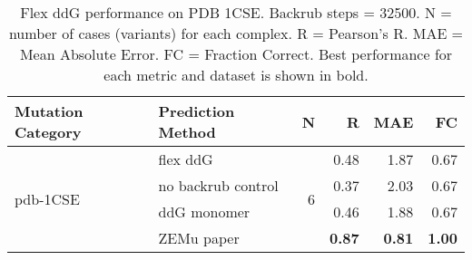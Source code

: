 \begin{table}
  \begin{tabular}{llrrrr}
\toprule
Mutation Category &   Prediction Method &  N &    R &  MAE &   FC \\
\midrule
 \multirow{ 4}{*}{pdb-1CSE} & flex ddG & \multirow{ 4}{*}{6} & 0.48 & 1.87 & 0.67  \\
 & no backrub control & & 0.37 & 2.03 & 0.67  \\
 & ddG monomer & & 0.46 & 1.88 & 0.67  \\
 & ZEMu paper & & \textbf{0.87} & \textbf{0.81} & \textbf{1.00}  \\
\bottomrule
\end{tabular}
  \caption[Flex ddG performance on PDB 1CSE]{
    Flex ddG performance on PDB 1CSE. Backrub steps = 32500. N = number of cases (variants) for each complex. R = Pearson's R. MAE = Mean Absolute Error. FC = Fraction Correct. Best performance for each metric and dataset is shown in bold.
  } \label{tab:table-pdb-1CSE}
\end{table}
